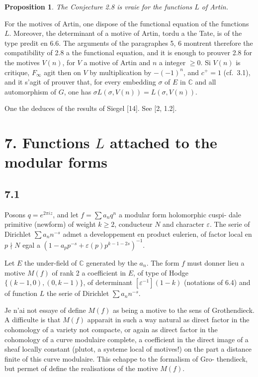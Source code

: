\documentclass[12pt,a4paper]{article}
\theoremstyle{plain}
\newtheorem{proposition}[theorem]{Proposition}
\theoremstyle{definition}
\theoremstyle{remark}
\newcommand{\C}{\mathbb{C}}
\begin{document}
\begin{proposition}\label{prop:6.7}
The Conjecture 2.8 is vraie for the functions $L$ of Artin.
\end{proposition}

For the motives of Artin, one dispose of the functional equation of the functions $L$.
Moreover, the determinant of a motive of Artin, tordu a the Tate, is of the type predit en
6.6. The arguments of the paragraphes 5, 6 montrent therefore the compatibility of 2.8 a
the functional equation, and it is enough to prouver 2.8 for the motives $V(n)$, for $V$ a
motive of Artin and $n$ a integer $\geq 0$. Si $V(n)$ is critique, $F_\infty$ agit then on $V$ by
multiplication by $-(-1)^n$, and $c^+ = 1$ (cf.~3.1), and it s'agit of prouver that, for every embedding $\sigma$ of $E$ in $\C$ and all automorphism of $G$, one has
$\sigma L(\sigma, V(n)) = L(\sigma, V(n))$.

One the deduces of the results of Siegel [14]. See [2, 1.2].


\section*{7. Functions $L$ attached to the modular forms}

\subsection*{7.1}

Posons $q = e^{2\pi i z}$, and let $f = \sum a_n q^n$ a modular form holomorphic cuspi-
dale primitive (newform) of weight $k \geq 2$, conducteur $N$ and character $\varepsilon$. The serie of
Dirichlet $\sum a_n n^{-s}$ admet a developpement en product eulerien, of factor local
en $p \nmid N$ egal a $(1 - a_p p^{-s} + \varepsilon(p) p^{k-1-2s})^{-1}$.

Let $E$ the under-field of $\C$ generated by the $a_n$. The form $f$ must donner lieu a
motive $M(f)$ of rank 2 a coefficient in $E$, of type of Hodge $\{(k-1,0), (0,k-1)\}$,
of determinant $[\varepsilon^{-1}](1-k)$ (notations of 6.4) and of function $L$ the serie of Dirichlet
$\sum a_n n^{-s}$.

Je n'ai not essaye of define $M(f)$ as being a motive to the sens of Grothendieck.
A difficulte is that $M(f)$ apparait in such a way natural as direct factor in
the cohomology of a variety not compacte, or again as direct factor in
the cohomology of a curve modulaire complete, a coefficient in the direct image
of a sheaf locally constant (plutot, a systeme local of motives!) on the part
a distance finite of this curve modulaire. This echappe to the formalism of Gro-
thendieck, but permet of define the realisations of the motive $M(f)$.
\end{document}
